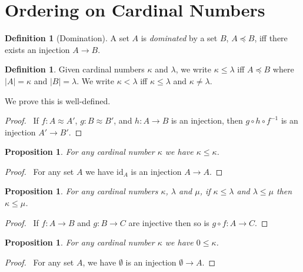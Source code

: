 \documentclass{book}
\let\qed\relax
\newtheorem{prop}[ax]{Proposition}
\theoremstyle{definition}
\newtheorem{df}[ax]{Definition}
\begin{document}
\section{Ordering on Cardinal Numbers}

\begin{df}[Domination]
A set $A$ is \emph{dominated} by a set $B$, $A \preccurlyeq B$, iff there exists an injection $A \rightarrow B$.
\end{df}

\begin{df}
Given cardinal numbers $\kappa$ and $\lambda$, we write $\kappa \leq \lambda$ iff $A \preccurlyeq B$ where $|A| = \kappa$ and $|B| = \lambda$. We write $\kappa < \lambda$ iff $\kappa \leq \lambda$ and $\kappa \neq \lambda$.

We prove this is well-defined.
\end{df}

\begin{proof}
\pf\ If $f : A \approx A'$, $g : B \approx B'$, and $h : A \rightarrow B$ is an injection, then $g \circ h \circ f^{-1}$ is an injection $A' \rightarrow B'$. \qed
\end{proof}

\begin{prop}
For any cardinal number $\kappa$ we have $\kappa \leq \kappa$.
\end{prop}

\begin{proof}
\pf\ For any set $A$ we have $\mathrm{id}_A$ is an injection $A \rightarrow A$. \qed
\end{proof}

\begin{prop}
For any cardinal numbers $\kappa$, $\lambda$ and $\mu$, if $\kappa \leq \lambda$ and $\lambda \leq \mu$ then $\kappa \leq \mu$.
\end{prop}

\begin{proof}
\pf\ If $f : A \rightarrow B$ and $g : B \rightarrow C$ are injective then so is $g \circ f : A \rightarrow C$. \qed
\end{proof}

\begin{prop}
For any cardinal number $\kappa$ we have $0 \leq \kappa$.
\end{prop}

\begin{proof}
\pf\ For any set $A$, we have $\emptyset$ is an injection $\emptyset \rightarrow A$. \qed
\end{proof}
\end{document}
